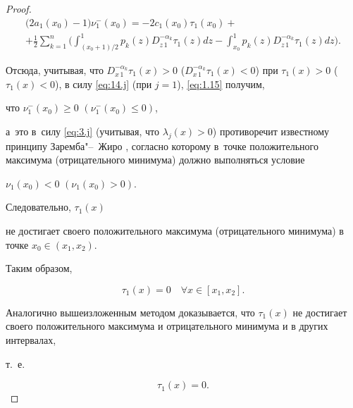 \begin{proof}
\begin{multline}
\bigl( {2{a_1}({x_0}) - 1} \bigr)\nu _1^ - ({x_0}) =  - 2{c_1}({x_0}){\tau _1}({x_0}) + 

\\

+ \frac{1}{2}\sum\limits_{k = 1}^n 

\biggl( \int _{({{{x_0} + 1}})/{2}}^1 {{p_k}(z)D_{z\,1}^{ - {\alpha _k}}{\tau _1}(z)dz}  -

  \int _{{x_0}}^1 {{p_k}(z)D_{z\,1}^{ - {\alpha _k}}{\tau _1}(z)dz}  

  \biggr). 

\end{multline}



Отсюда, учитывая,  что $D_{x\,1}^{ - {\alpha _k}}{\tau _1}(x) > 0$ ($D_{x\,1}^{ - {\alpha _k}}{\tau _1}(x) < 0$) при \mbox{${\tau _1}(x) > 0$} \mbox{(${\tau _1}(x) < 0$)}, в силу \eqref{eq:14.j} (при $j=1$), \eqref{eq:1.15}    получим, 

что $\nu _1^ - ({x_0}) \ge 0$ $\left( {\nu _1^ - ({x_0}) \le 0} \right)$, 

а~это  в~силу \eqref{eq:3.j} (учитывая, что ${\lambda _j}(x) > 0$) противоречит известному принципу Заремба"--~Жиро \cite{Bits:bib:Bitsad}, согласно которому в~точке положительного максимума (отрицательного минимума) должно выполняться условие

${\nu _1}({x_0}) < 0$ $\left( {{\nu _1}({x_0}) > 0} \right)$. 

Следовательно, ${\tau _1}(x)$

не  достигает своего положительного максимума (отрицательного минимума) в точке ${x_0} \in  ( {x_1}, {x_2})$.



Таким образом,

\begin{equation}

{\tau _1}(x) = 0 \quad  \forall x \in [ {x_1}, {x_2}].\label{eq:1.16}

\end{equation}

Аналогично вышеизложенным методом доказывается, что ${\tau _1}(x)$ не  достигает своего положительного максимума и отрицательного минимума { и в других интервалах},

т.~е.

\begin{equation}

\tau_1(x) = 0. \label{eq:1.17}

\end{equation}






\end{proof}
